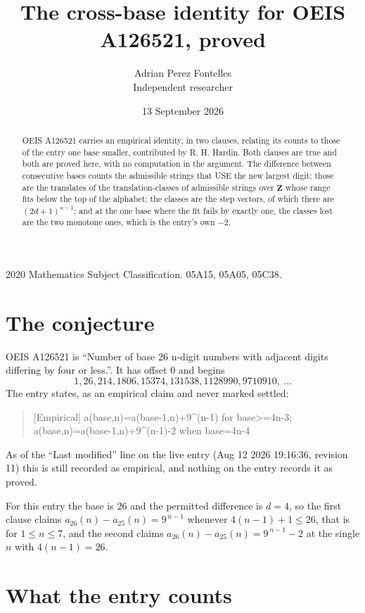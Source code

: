 \documentclass[11pt,a4paper]{article}
\title{The cross-base identity for OEIS A126521, proved}
\author{Adrian Perez Fontelles\\ \small Independent researcher}
\date{13 September 2026}
\theoremstyle{plain}
\theoremstyle{definition}
\begin{document}
\maketitle

\begin{abstract}
OEIS A126521 carries an empirical identity, in two clauses, relating its counts to those of the
entry one base smaller, contributed by R. H. Hardin. Both clauses are true and both are proved
here, with no computation in the argument. The difference between consecutive bases counts the
admissible strings that USE the new largest digit; those are the translates of the
translation-classes of admissible strings over $\mathbf{Z}$ whose range fits below the top of
the alphabet; the classes are the step vectors, of which there are $(2d+1)^{n-1}$; and at the
one base where the fit fails by exactly one, the classes lost are the two monotone ones, which
is the entry's own $-2$.
\end{abstract}

\noindent\small 2020 Mathematics Subject Classification. 05A15, 05A05, 05C38.\normalsize

\section{The conjecture}

OEIS A126521 is ``Number of base 26 n-digit numbers with adjacent digits differing by four or less.''. It has offset $0$ and begins
\[
1, 26, 214, 1806, 15374, 131538, 1128990, 9710910,\ \dots
\]
The entry states, as an empirical claim and never marked settled:
\begin{quote}
[Empirical] a(base,n)=a(base-1,n)+9\textasciicircum{}(n-1) for base>=4n-3; a(base,n)=a(base-1,n)+9\textasciicircum{}(n-1)-2 when base=4n-4
\end{quote}
As of the ``Last modified'' line on the live entry (Aug 12 2026 19:16:36, revision 11)
this is still recorded as empirical, and nothing on the entry records it as proved.

For this entry the base is $26$ and the permitted difference is $d=4$, so the first clause
claims $a_{26}(n)-a_{25}(n)=9^{\,n-1}$ whenever $4(n-1)+1\le26$, that is for
$1\le n\le7$, and the second claims $a_{26}(n)-a_{25}(n)=9^{\,n-1}-2$ at the single
$n$ with $4(n-1)=26$.

\section{What the entry counts}
\end{document}
